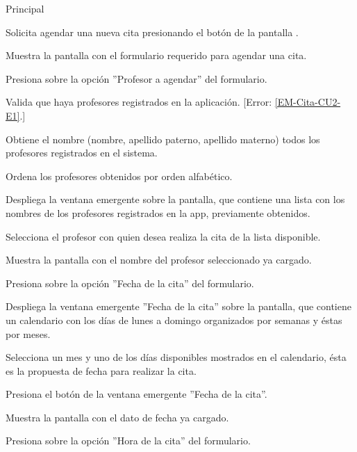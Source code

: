 \begin{UCtrayectoria}{Principal}

	\UCpaso [\UCactor] Solicita agendar una nueva cita presionando el botón \IUbutton{ + } de la pantalla . 

	\UCpaso Muestra la pantalla  con el formulario requerido para agendar una cita. \label{l_EM_Citas_CU2_formulario}

	\UCpaso [\UCactor] Presiona sobre la opción ''Profesor a agendar'' del formulario. 

	\UCpaso Valida que haya profesores registrados en la aplicación. [Error: \ref{EM-Cita-CU2-E1}.]

	\UCpaso Obtiene el nombre (nombre, apellido paterno, apellido materno) todos los profesores registrados en el sistema. 

	\UCpaso Ordena los profesores obtenidos por orden alfabético.

	\UCpaso Despliega la ventana emergente sobre la pantalla, que contiene una lista con los nombres de los profesores registrados en la app, previamente obtenidos.

	\UCpaso [\UCactor] Selecciona el profesor con quien desea realiza la cita de la lista disponible.

	\UCpaso Muestra la pantalla  con el nombre del profesor seleccionado ya cargado.

	\UCpaso [\UCactor] Presiona sobre la opción ''Fecha de la cita'' del formulario. \label{l_EM_Citas_CU2_fecha} 

	\UCpaso Despliega la ventana emergente ''Fecha de la cita'' sobre la pantalla, que contiene un calendario con los días de lunes a domingo organizados por semanas y éstas por meses. 

	\UCpaso [\UCactor] Selecciona un mes y uno de los días disponibles mostrados en el calendario, ésta es la propuesta de fecha para realizar la cita.

	\UCpaso [\UCactor] Presiona el botón  de la ventana emergente ''Fecha de la cita''. 

	\UCpaso Muestra la pantalla  con el dato de fecha ya cargado.

	\UCpaso [\UCactor] Presiona sobre la opción ''Hora de la cita'' del formulario. \label{l_EM_Citas_CU2_hora}


\end{UCtrayectoria}
